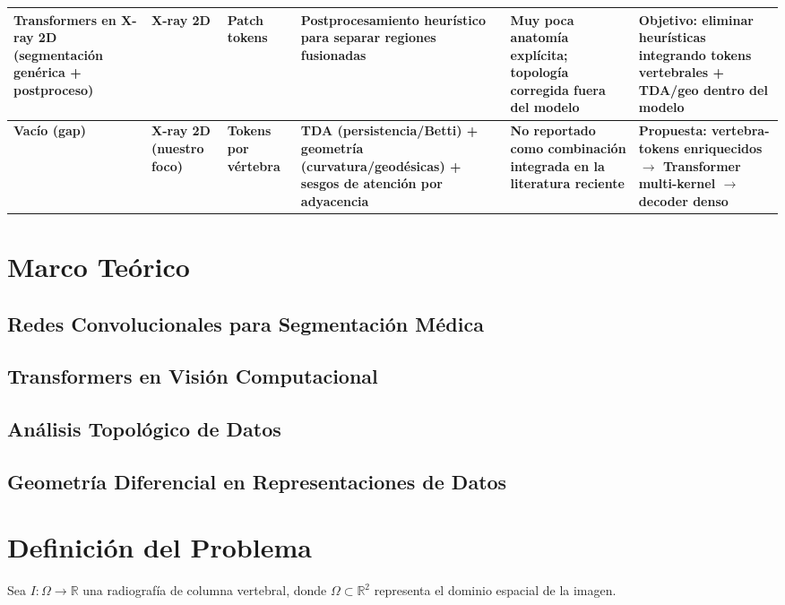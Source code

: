 \documentclass[conference]{IEEEtran}
\begin{document}
\begin{table}[t]
{\begin{tabular}{p{2.2cm} p{2.1cm} p{2.2cm} p{2.9cm} p{2.9cm} p{3.6cm}}
Transformers en X-ray 2D (segmentación genérica + postproceso) &
X-ray 2D &
Patch tokens &
Postprocesamiento heurístico para separar regiones fusionadas &
Muy poca anatomía explícita; topología corregida fuera del modelo &
Objetivo: eliminar heurísticas integrando tokens vertebrales + TDA/geo dentro del modelo \\
\hline

\textbf{Vacío (gap)} &
\textbf{X-ray 2D (nuestro foco)} &
\textbf{Tokens por vértebra} &
\textbf{TDA (persistencia/Betti) + geometría (curvatura/geodésicas) + sesgos de atención por adyacencia} &
\textbf{No reportado como combinación integrada en la literatura reciente} &
\textbf{Propuesta: vertebra-tokens enriquecidos $\rightarrow$ Transformer multi-kernel $\rightarrow$ decoder denso} \\
\hline
\end{tabular}%
}
\end{table}

\section{Marco Teórico}

\subsection{Redes Convolucionales para Segmentación Médica}

\subsection{Transformers en Visión Computacional}

\subsection{Análisis Topológico de Datos}

\subsection{Geometría Diferencial en Representaciones de Datos}


\section{Definición del Problema}

Sea $I : \Omega \rightarrow \mathbb{R}$ una radiografía de columna vertebral, donde
$\Omega \subset \mathbb{R}^2$ representa el dominio espacial de la imagen.
\end{document}
